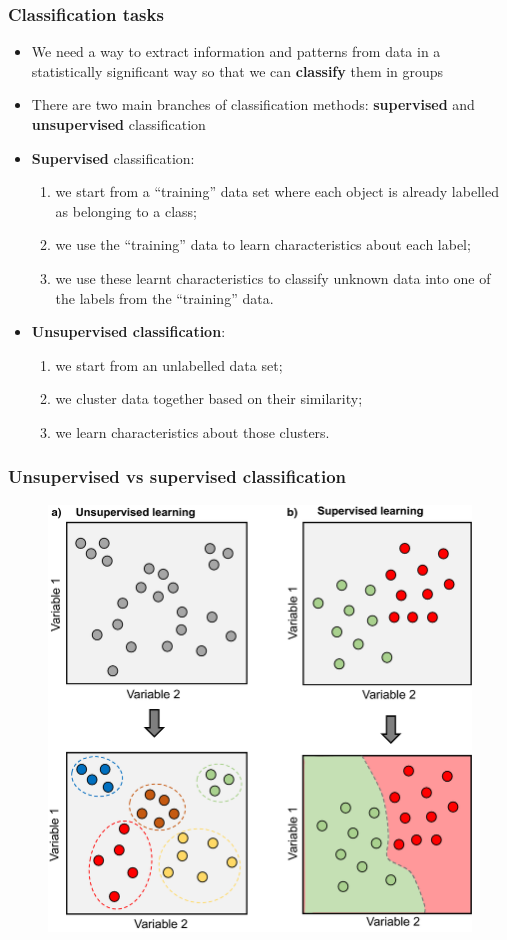 \documentclass{beamer}
\begin{document}
\begin{frame}
	\frametitle{Classification tasks}
	\begin{itemize}
		\item We need a way to extract information and patterns from data in a statistically significant way so that we can \textbf{classify} them in groups
		\item There are two main branches of classification methods: \textbf{supervised} and \textbf{unsupervised} classification
		\item \textbf{Supervised} classification: \begin{enumerate}
			\item we start from a ``training'' data set where each object is already labelled as belonging to a class;
			\item we use the ``training'' data to learn characteristics about each label;
			\item we use these learnt characteristics to classify unknown data into one of the labels from the ``training'' data.
		\end{enumerate}
		\item \textbf{Unsupervised classification}:
		\begin{enumerate}
			\item we start from an unlabelled data set;
			\item we cluster data together based on their similarity;
			\item we learn characteristics about those clusters.
		\end{enumerate}
	\end{itemize}
\end{frame}
\begin{frame}
	\frametitle{Unsupervised vs supervised classification}
	\begin{figure}
		\centering
		\includegraphics[width=0.5\linewidth]{img/supervised}
		\label{fig:supervised}
	\end{figure}
\end{frame}
\end{document}

